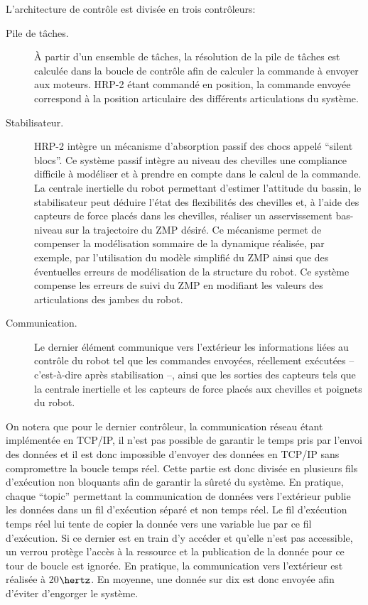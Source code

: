 L'architecture de contrôle est divisée en trois contrôleurs:
\begin{description}
\item[Pile de tâches.] À partir d'un ensemble de
  tâches, la résolution de la pile de tâches est calculée dans la
  boucle de contrôle afin de calculer la commande à envoyer aux
  moteurs. HRP-2 étant commandé en position, la commande envoyée
  correspond à la position articulaire des différents articulations du
  système.
\item[Stabilisateur.] HRP-2 intègre un mécanisme
  d'absorption passif des chocs appelé ``silent blocs''. Ce système passif intègre au niveau des chevilles une
  compliance difficile à modéliser et à prendre en compte dans le
  calcul de la commande. La centrale inertielle du robot permettant
  d'estimer l'attitude du bassin, le stabilisateur peut déduire
  l'état des flexibilités des chevilles et, à l'aide des capteurs de
  force placés dans les chevilles, réaliser un asservissement
  bas-niveau sur la trajectoire du ZMP
  désiré. Ce mécanisme permet de compenser la modélisation sommaire de
  la dynamique réalisée, par exemple, par l'utilisation du modèle
  simplifié du ZMP ainsi que des éventuelles erreurs de modélisation
  de la structure du robot. Ce système compense les erreurs de suivi
  du ZMP en modifiant les valeurs des articulations des jambes du
  robot.
\item[Communication.] Le dernier élément communique vers l'extérieur
  les informations liées au contrôle du robot tel que les commandes
  envoyées, réellement exécutées -- c'est-à-dire après stabilisation
  --, ainsi que les sorties des capteurs tels que la centrale
  inertielle et les capteurs de force placés aux chevilles et poignets
  du robot.
\end{description}


On notera que pour le dernier contrôleur, la communication réseau
étant implémentée en TCP/IP, il n'est pas possible de
garantir le temps pris par l'envoi des données et il est donc
impossible d'envoyer des données en TCP/IP sans
compromettre la boucle temps réel. Cette partie est donc divisée en
plusieurs fils d'exécution non bloquants afin de garantir la sûreté du
système. En pratique, chaque ``topic'' permettant la communication de
données vers l'extérieur publie les données dans un fil d'exécution
séparé et non temps réel. Le fil d'exécution
temps réel lui tente de copier la donnée vers une variable lue par ce
fil d'exécution. Si ce dernier est en train d'y accéder et qu'elle
n'est pas accessible, un verrou protège l'accès à la ressource et la
publication de la donnée pour ce tour de boucle est ignorée. En
pratique, la communication vers l'extérieur est réalisée à 20$\hertz$. En
moyenne, une donnée sur dix est donc envoyée afin d'éviter d'engorger
le système.


